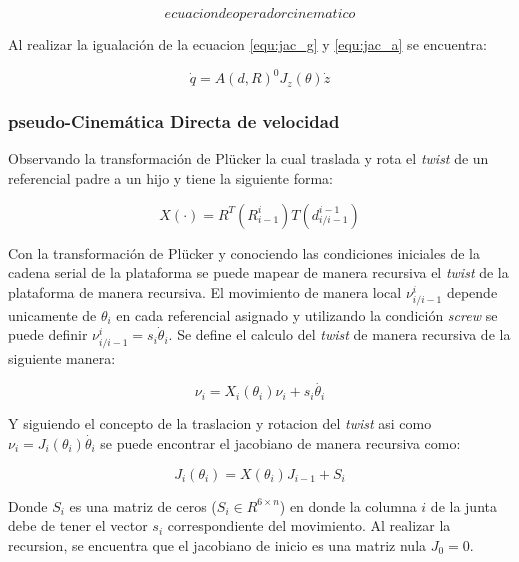 \begin{equation}
ecuacion de operador cinematico
\end{equation}

Al realizar la igualación de la ecuacion \ref{equ:jac_g} y \ref{equ:jac_a} se encuentra:

\begin{equation} \label{equ:q_twist}
\dot{q} = A(d,R)^0J_z(\theta) \dot{z}
\end{equation}

\subsubsection{pseudo-Cinemática Directa de velocidad}

Observando la transformación de Plücker la cual traslada y rota el \emph{twist} de un referencial padre a un hijo y tiene la siguiente forma:

\begin{equation} \label{equ:plucker}
X(\cdot) = R^T(R_{i-1}^i)T(d_{i/i-1}^{i-1})
\end{equation}

Con la transformación de Plücker y conociendo las condiciones iniciales de la cadena serial de la plataforma se puede mapear de manera recursiva el \emph{twist} de la plataforma de manera recursiva. El movimiento de manera local $\nu_{i/i-1}^{i}$ depende unicamente de $\theta_i$ en cada referencial asignado y utilizando la condición \emph{screw} se puede definir $\nu_{i/i-1}^{i} = s_i \dot{\theta}_i$. Se define el calculo del \emph{twist} de manera recursiva de la siguiente manera:

\begin{equation} \label{equ:tiwst_rec}
\nu_i = X_i(\theta_i)\nu_i + s_i\dot{\theta_i}
\end{equation}

Y siguiendo el concepto de la traslacion y rotacion del \emph{twist} asi como $\nu_i = J_{i}(\theta_i)\dot{\theta_i}$ se puede encontrar el jacobiano de manera recursiva como:

\begin{equation}
J_i(\theta_i) = X(\theta_i) J_{i-1} + S_i
\end{equation}

Donde $S_i$ es una matriz de ceros ($S_i \in R^{6\times n}$) en donde la columna $i$ de la junta debe de tener el vector $s_i$ correspondiente del movimiento. Al realizar la recursion, se encuentra que el jacobiano de inicio es una matriz nula $J_0 = 0$.

